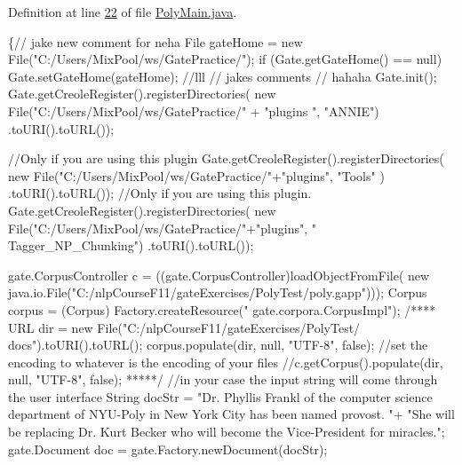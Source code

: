 Definition at line \hyperlink{L22}{22} of file \hyperlink{}{Poly\-Main.\-java}.


\begin{DoxyCode}
    \{\textcolor{comment}{// jake new comment for neha}
        File gateHome = \textcolor{keyword}{new} File(\textcolor{stringliteral}{"C:/Users/MixPool/ws/GatePractice/"});
        \textcolor{keywordflow}{if} (Gate.getGateHome() == null)
            Gate.setGateHome(gateHome);
       \textcolor{comment}{//lll}
        \textcolor{comment}{// jakes comments }
        \textcolor{comment}{// hahaha }
        Gate.init();
        Gate.getCreoleRegister().registerDirectories(
                        \textcolor{keyword}{new} File(\textcolor{stringliteral}{"C:/Users/MixPool/ws/GatePractice/"} + \textcolor{stringliteral}{"plugins
      "}, \textcolor{stringliteral}{"ANNIE"})
                                .toURI().toURL());
        
        \textcolor{comment}{//Only if you are using this plugin}
        Gate.getCreoleRegister().registerDirectories(
                \textcolor{keyword}{new} File(\textcolor{stringliteral}{"C:/Users/MixPool/ws/GatePractice/"}+\textcolor{stringliteral}{"plugins"}, \textcolor{stringliteral}{"Tools"}
      )
                        .toURI().toURL()); 
        \textcolor{comment}{//Only if you are using this plugin.}
        Gate.getCreoleRegister().registerDirectories(
                \textcolor{keyword}{new} File(\textcolor{stringliteral}{"C:/Users/MixPool/ws/GatePractice/"}+\textcolor{stringliteral}{"plugins"}, \textcolor{stringliteral}{"
      Tagger\_NP\_Chunking"})
                        .toURI().toURL()); 
        
        
        gate.CorpusController c = ((gate.CorpusController)loadObjectFromFile(\textcolor{keyword}{
      new} java.io.File(\textcolor{stringliteral}{"C:/nlpCourseF11/gateExercises/PolyTest/poly.gapp"})));
        Corpus corpus = (Corpus) Factory.createResource(\textcolor{stringliteral}{"
      gate.corpora.CorpusImpl"});
        \textcolor{comment}{/****}
\textcolor{comment}{        URL dir = new File("C:/nlpCourseF11/gateExercises/PolyTest/
      docs").toURI().toURL();}
\textcolor{comment}{        corpus.populate(dir, null, "UTF-8", false); //set the encoding to
       whatever is the encoding of your files}
\textcolor{comment}{        //c.getCorpus().populate(dir, null, "UTF-8", false);}
\textcolor{comment}{        *****/}
        \textcolor{comment}{//in your case the input string will come through the user interface}
        String docStr = \textcolor{stringliteral}{"Dr. Phyllis Frankl of the computer science department
       of NYU-Poly in New York City has been named provost. "}+
                        \textcolor{stringliteral}{"She will be replacing Dr. Kurt Becker who will become
       the Vice-President for miracles."};
        gate.Document doc = gate.Factory.newDocument(docStr);
        

\end{DoxyCode}

